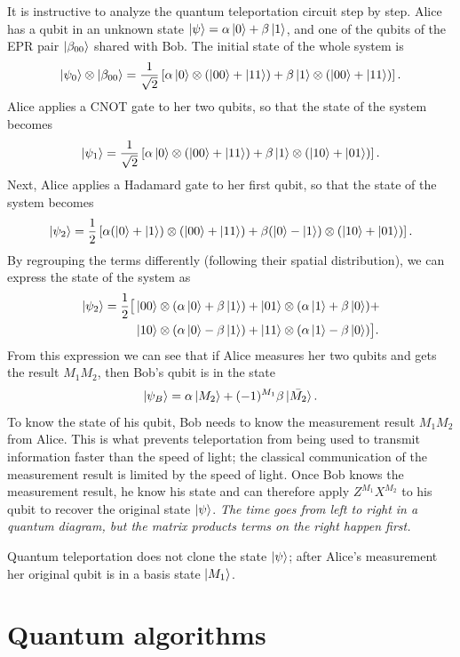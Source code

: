 It is instructive to analyze the quantum teleportation circuit step by step.
Alice has a qubit in an unknown state $\ket{\psi}=\alpha \ket{0} + \beta \ket{1}$,
and one of the qubits of the EPR pair $\ket{\beta_{00}}$ shared with Bob.
The initial state of the whole system is
\[
    \ket{\psi_0} \otimes \ket{\beta_{00}} = \frac{1}{\sqrt{2}}
    \left[
        \alpha\ket{0} \otimes (\ket{00} + \ket{11}) +
        \beta\ket{1} \otimes (\ket{00} + \ket{11})
    \right].
\]
Alice applies a CNOT gate to her two qubits, so that the state of the system becomes
\[
    \ket{\psi_1} = \frac{1}{\sqrt{2}}
    \left[
        \alpha\ket{0} \otimes (\ket{00} + \ket{11}) + 
        \beta\ket{1} \otimes (\ket{10} + \ket{01})
    \right].
\]
Next, Alice applies a Hadamard gate to her first qubit, so that the state of the system becomes
\[
    \ket{\psi_2} = \frac{1}{2}
    \left[
        \alpha(\ket{0} + \ket{1}) \otimes (\ket{00} + \ket{11}) +
        \beta(\ket{0} - \ket{1}) \otimes (\ket{10} + \ket{01})  
    \right].
\]
By regrouping the terms differently (following their spatial distribution),
we can express the state of the system as
\[
\begin{aligned}
    \ket{\psi_2} = \frac{1}{2} \big[ & \ket{00} \otimes (\alpha\ket{0} + \beta\ket{1}) + 
    \ket{01} \otimes (\alpha\ket{1} + \beta\ket{0}) + \\
    & \ket{10} \otimes (\alpha\ket{0} - \beta\ket{1}) +
    \ket{11} \otimes (\alpha\ket{1} - \beta\ket{0}) 
    \big].
\end{aligned}
\]
From this expression we can see that if Alice measures her two qubits and gets the result $M_1 M_2$,
then Bob's qubit is in the state
\[
    \ket{\psi_B} = \alpha\ket{M_2} + (-1)^{M_1}\beta\ket{\bar{M_2}}.
\]
To know the state of his qubit, Bob needs to know the measurement result $M_1 M_2$ from Alice.
This is what prevents teleportation from being used to transmit information faster than the speed of light; 
the classical communication of the measurement result is limited by the speed of light.
Once Bob knows the measurement result,
he know his state and can therefore apply $Z^{M_1}X^{M_2}$ to his qubit to recover the original state $\ket{\psi}$.
\emph{The time goes from left to right in a quantum diagram, but the matrix products terms on the right happen first.}

Quantum teleportation does not clone the state $\ket{\psi}$;
after Alice's measurement her original qubit is in a basis state $\ket{M_1}$.

\section{Quantum algorithms}

